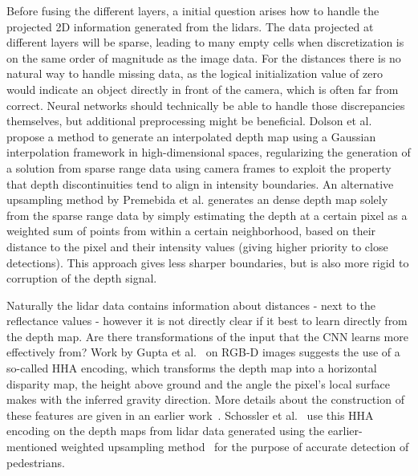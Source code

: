 Before fusing the different layers, a initial question arises how to handle the projected 2D information generated from the lidars. The data projected at different layers will be sparse, leading to many empty cells when discretization is on the same order of magnitude as the image data. For the distances there is no natural way to handle missing data, as the logical initialization value of zero would indicate an object directly in front of the camera, which is often far from correct. Neural networks should technically be able to handle those discrepancies themselves, but additional preprocessing might be beneficial. Dolson et al.~\cite{dolson2010} propose a method to generate an interpolated depth map using a Gaussian interpolation framework in high-dimensional spaces, regularizing the generation of a solution from sparse range data using camera frames to exploit the property that depth discontinuities tend to align in intensity boundaries. An alternative upsampling method by Premebida et al.\cite{premebida2014} generates an dense depth map solely from the sparse range data by simply estimating the depth at a certain pixel as a weighted sum of points from within a certain neighborhood, based on their distance to the pixel and their intensity values (giving higher priority to close detections). This approach gives less sharper boundaries, but is also more rigid to corruption of the depth signal.  

Naturally the lidar data contains information about distances - next to the reflectance values - however it is not directly clear if it best to learn directly from the depth map. Are there transformations of the input that the CNN learns more effectively from? Work by Gupta et al.~\cite{gupta2014} on RGB-D images suggests the use of a so-called HHA encoding, which transforms the depth map into a horizontal disparity map, the height above ground and the angle the pixel's local surface makes with the inferred gravity direction. More details about the construction of these features are given in an earlier work~\cite{gupta2013}. Schossler et al.~\cite{schlosser2016} use this HHA encoding on the depth maps from lidar data generated using the earlier-mentioned weighted upsampling method~\cite{premebida2014} for the purpose of accurate detection of pedestrians.
